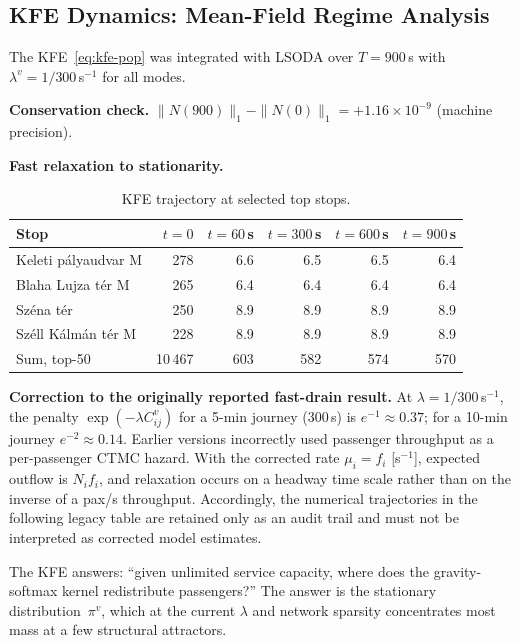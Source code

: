 \documentclass[11pt,a4paper]{article}
\theoremstyle{plain}
\theoremstyle{definition}
\theoremstyle{remark}
\begin{document}
\subsection{KFE Dynamics: Mean-Field Regime Analysis}

The KFE~\eqref{eq:kfe-pop} was integrated with LSODA over $T=900$\,s with
$\lambda^v=1/300$\,s$^{-1}$ for all modes.

\textbf{Conservation check.}
$\|N(900)\|_1-\|N(0)\|_1=+1.16\times10^{-9}$ (machine precision).

\textbf{Fast relaxation to stationarity.}

\begin{table}[h]
\centering
\caption{KFE trajectory at selected top stops.}
\label{tab:kfe-traj}
\begin{tabular}{lrrrrr}
\toprule
Stop & $t=0$ & $t=60$\,s & $t=300$\,s & $t=600$\,s & $t=900$\,s \\
\midrule
Keleti p\'alyaudvar M      & 278 &  6.6 &  6.5 &  6.5 &  6.4 \\
Blaha Lujza t\'er M        & 265 &  6.4 &  6.4 &  6.4 &  6.4 \\
Sz\'ena t\'er              & 250 &  8.9 &  8.9 &  8.9 &  8.9 \\
Sz\'ell K\'alm\'an t\'er M & 228 &  8.9 &  8.9 &  8.9 &  8.9 \\
\midrule
Sum, top-50                & 10\,467 & 603 & 582 & 574 & 570 \\
\bottomrule
\end{tabular}
\end{table}

\textbf{Correction to the originally reported fast-drain result.}
At $\lambda=1/300$\,s$^{-1}$, the penalty $\exp(-\lambda C^v_{ij})$ for a
5-min journey (300\,s) is $e^{-1}\approx0.37$; for a 10-min journey
$e^{-2}\approx0.14$.  Earlier versions incorrectly used passenger throughput
as a per-passenger CTMC hazard.  With the corrected rate
$\mu_i=f_i$ [s$^{-1}$], expected outflow is $N_i f_i$, and relaxation occurs
on a headway time scale rather than on the inverse of a pax/s throughput.
Accordingly, the numerical trajectories in the following legacy table are
retained only as an audit trail and must not be interpreted as corrected
model estimates.

The KFE answers: ``given unlimited service capacity, where does the
gravity-softmax kernel redistribute passengers?''  The answer is the stationary
distribution~$\pi^v$, which at the current $\lambda$ and network sparsity
concentrates most mass at a few structural attractors.
\end{document}

